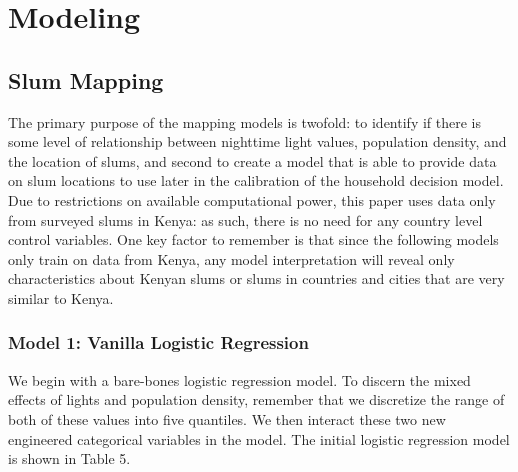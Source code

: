 
\section{Modeling}

\subsection{Slum Mapping}

The primary purpose of the mapping models is twofold: to identify if there is some level of relationship between nighttime light values, population density, and the location of slums, and second to create a model that is able to provide data on slum locations to use later in the calibration of the household decision model. Due to restrictions on available computational power, this paper uses data only from surveyed slums in Kenya: as such, there is no need for any country level control variables. One key factor to remember is that since the following models only train on data from Kenya, any model interpretation will reveal only characteristics about Kenyan slums or slums in countries and cities that are very similar to Kenya.

\subsubsection{Model 1: Vanilla Logistic Regression}
We begin with a bare-bones logistic regression model. To discern the mixed effects of lights and population density, remember that we discretize the range of both of these values into five quantiles. We then interact these two new engineered categorical variables in the model. The initial logistic regression model is shown in Table 5.


